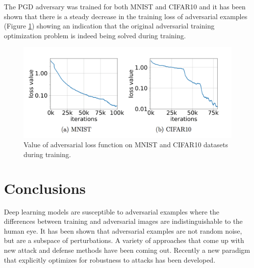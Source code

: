 \documentclass[10pt]{article}
\begin{document}
The PGD adversary was trained for both MNIST and CIFAR10 and it has been shown that there is a steady decrease in the training loss of
adversarial examples (Figure \ref{fig:itworks}) showing an indication that the original adversarial training optimization problem is indeed being solved during training.

\begin{figure}[!h]
\centering
\includegraphics[width=0.6\linewidth]{itworks}
\caption{Value of adversarial loss function on MNIST and CIFAR10 datasets during training.}
\label{fig:itworks}
\end{figure}

\section{Conclusions}

Deep learning models are susceptible to adversarial examples where the differences between training and adversarial images are indistinguishable to the human eye. It has been shown that adversarial examples are not random noise, but are a subspace of perturbations. A variety of approaches that come up with new attack and defense methods have been coming out. Recently a new paradigm that explicitly optimizes for robustness to attacks has been developed. 




\end{document}
